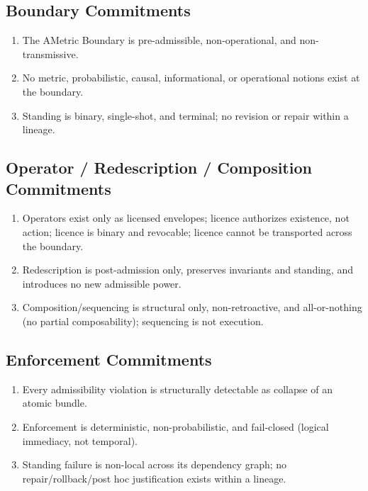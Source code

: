 \documentclass[12pt]{article}
\theoremstyle{plain}
\begin{document}
\subsection{Boundary Commitments}

\begin{enumerate}[leftmargin=*]
\item The AMetric Boundary is pre-admissible, non-operational, and non-transmissive.
\item No metric, probabilistic, causal, informational, or operational notions exist at the boundary.
\item Standing is binary, single-shot, and terminal; no revision or repair within a lineage.
\end{enumerate}

\subsection{Operator / Redescription / Composition Commitments}

\begin{enumerate}[leftmargin=*]
\item Operators exist only as licensed envelopes; licence authorizes existence, not action; licence is binary and revocable; licence cannot be transported across the boundary.
\item Redescription is post-admission only, preserves invariants and standing, and introduces no new admissible power.
\item Composition/sequencing is structural only, non-retroactive, and all-or-nothing (no partial composability); sequencing is not execution.
\end{enumerate}

\subsection{Enforcement Commitments}

\begin{enumerate}[leftmargin=*]
\item Every admissibility violation is structurally detectable as collapse of an atomic bundle.
\item Enforcement is deterministic, non-probabilistic, and fail-closed (logical immediacy, not temporal).
\item Standing failure is non-local across its dependency graph; no repair/rollback/post hoc justification exists within a lineage.
\end{enumerate}
\end{document}
